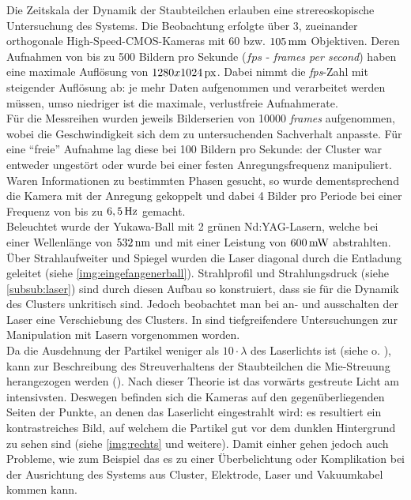 \documentclass[numbers=noenddot,a4paper,notitlepage,twoside,BCOR15mm]{scrbook}
\newcommand{\tilt}[1]{\textit{#1}}
\begin{document}
			Die Zeitskala der Dynamik der Staubteilchen erlauben eine strereoskopische Untersuchung des Systems. Die Beobachtung erfolgte \"uber 3, zueinander orthogonale High-Speed-CMOS-Kameras mit 60 bzw. $\unit[105]{mm}$ Objektiven. Deren Aufnahmen von bis zu 500 Bildern pro Sekunde ($\unit{fps}$ - \tilt{frames per second}) haben eine maximale Aufl\"osung von $\unit[1280x1024]{px}$. Dabei nimmt die \tilt{fps}-Zahl mit steigender Auflösung ab: je mehr Daten aufgenommen und verarbeitet werden müssen, umso niedriger ist die maximale, verlustfreie Aufnahmerate.\\
			Für die Messreihen wurden jeweils Bilderserien von 10000 \tilt{frames} aufgenommen, wobei die Geschwindigkeit sich dem zu untersuchenden Sachverhalt anpasste. F\"ur eine "`freie"' Aufnahme lag diese bei 100 Bildern pro Sekunde: der Cluster war entweder ungest\"ort oder wurde bei einer festen Anregungsfrequenz manipuliert. Waren Informationen zu bestimmten Phasen gesucht, so wurde dementsprechend die Kamera mit der Anregung gekoppelt und dabei 4 Bilder pro Periode bei einer Frequenz von bis zu $\unit[6,5]{Hz}$ gemacht. \\
			Beleuchtet wurde der Yukawa-Ball mit 2 gr\"unen Nd:YAG-Lasern, welche bei einer Wellenl\"ange von $\unit[532]{nm}$ und mit einer Leistung von $\unit[600]{mW}$ abstrahlten. Über Strahlaufweiter und Spiegel wurden die Laser diagonal durch die Entladung geleitet (siehe \ref{img:eingefangenerball}). Strahlprofil und Strahlungsdruck (siehe \ref{subsub:laser}) sind durch diesen Aufbau so konstruiert, dass sie f\"ur die Dynamik des Clusters unkritisch sind. Jedoch beobachtet man bei an- und ausschalten der Laser eine Verschiebung des Clusters. In \cite{Mulsow13} sind tiefgreifendere Untersuchungen zur Manipulation mit Lasern vorgenommen worden.\\
			Da die Ausdehnung der Partikel weniger als $10\cdot\lambda$ des Laserlichts ist (siehe \cite{Mie08} o. \cite{Hulst81}), kann zur Beschreibung des Streuverhaltens der Staubteilchen die Mie-Streuung herangezogen werden (\cite{Bonitz10}). Nach dieser Theorie ist das vorw\"arts gestreute Licht am intensivsten. Deswegen befinden sich die Kameras auf den gegen\"uberliegenden Seiten der Punkte, an denen das Laserlicht eingestrahlt wird: es resultiert ein kontrastreiches Bild, auf welchem die Partikel gut vor dem dunklen Hintergrund zu sehen sind (siehe \ref{img:rechts} und weitere). Damit einher gehen jedoch auch Probleme, wie zum Beispiel das es zu einer \"Uberbelichtung oder Komplikation bei der Ausrichtung des Systems aus Cluster, Elektrode, Laser und Vakuumkabel kommen kann.
\end{document}
